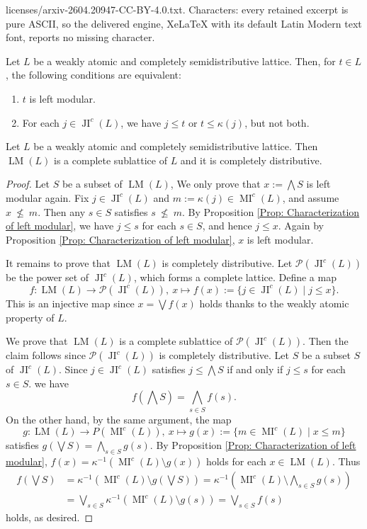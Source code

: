 \documentclass[10pt,a4paper]{amsart}
\DeclareMathOperator*{\JI}{JI}
\DeclareMathOperator*{\LM}{LM}
\DeclareMathOperator*{\MI}{MI}
\begin{document}
licenses/arxiv-2604.20947-CC-BY-4.0.txt. Characters: every retained excerpt is pure ASCII, so the delivered engine, XeLaTeX with its default Latin Modern text font, reports no missing character.
\begin{proposition}\label{Prop: Characterization of left modular}
Let $L$ be a weakly atomic and completely semidistributive lattice.
Then, for $t\in L$, the following conditions are equivalent:
\begin{enumerate}
    \item $t$ is left modular.
    \item For each $j\in{\JI^c}(L)$, we have $j\le t$ or $t\le \kappa(j)$, but not both.
\end{enumerate}
\end{proposition}

\begin{proposition}\label{Prop: LM(L) is distributive sublattice}
Let $L$ be a weakly atomic and completely semidistributive lattice. 
Then $\LM(L)$ is a complete sublattice of $L$ and it is completely distributive.
\end{proposition}

\begin{proof}
Let $S$ be a subset of $\LM(L)$, We only prove that $x:=\bigwedge S$ is left modular again.
Fix $j\in{\JI^c}(L)$ and $m:=\kappa(j)\in{\MI^c}(L)$, and assume $x\ {\not\leq}\ m$. Then any $s\in S$ satisfies $s\ {\not\leq}\ m$. By Proposition \ref{Prop: Characterization of left modular}, we have $j\leq s$ for each $s\in S$, and hence $j\leq x$. Again by Proposition \ref{Prop: Characterization of left modular}, $x$ is left modular.

It remains to prove that $\LM(L)$ is completely distributive.
Let $\mathcal{P}({\JI^c}(L))$ be the power set of ${\JI^c}(L)$, which forms a complete lattice. Define a map
\[f:\LM(L)\to \mathcal{P}({\JI\nolimits^c}(L)),\ x\mapsto f(x):=\{j\in{\JI\nolimits^c}(L)\mid j\le x\}.\]
This is an injective map since $x=\bigvee f(x)$ holds thanks to the weakly atomic property of $L$.

We prove that $\LM(L)$ is a complete sublattice of $\mathcal{P}({\JI^c}(L))$. Then the claim follows since $\mathcal{P}({\JI^c}(L))$ is completely distributive.
Let $S$ be a subset $S$ of ${\JI^c}(L)$. Since  $j\in{\JI^c}(L)$ satisfies $j\le\bigwedge S$ if and only if $j\le s$ for each $s\in S$.
we have
\[f(\bigwedge S)=\bigwedge_{s\in S} f(s).\]
On the other hand, by the same argument, the map
\[g:\LM(L)\to P({\MI\nolimits^c}(L)),\ x\mapsto g(x):=\{m\in{\MI\nolimits^c}(L)\mid x\le m\}\]
satisfies $g(\bigvee S)=\bigwedge_{s\in S} g(s)$.
By Proposition \ref{Prop: Characterization of left modular}, $f(x)=\kappa^{-1}({\MI^c}(L)\setminus g(x))$ holds for each $x\in\LM(L)$. Thus
\begin{align*}
f(\bigvee S)&=\kappa^{-1}({\MI\nolimits^c}(L)\setminus g(\bigvee S))=\kappa^{-1}({\MI\nolimits^c}(L)\setminus \bigwedge_{s\in S}g(s))\\
&=\bigvee_{s\in S}\kappa^{-1}({\MI\nolimits^c}(L)\setminus g(s))=\bigvee_{s\in S}f(s)
\end{align*}
holds, as desired.
\end{proof}
\end{document}
